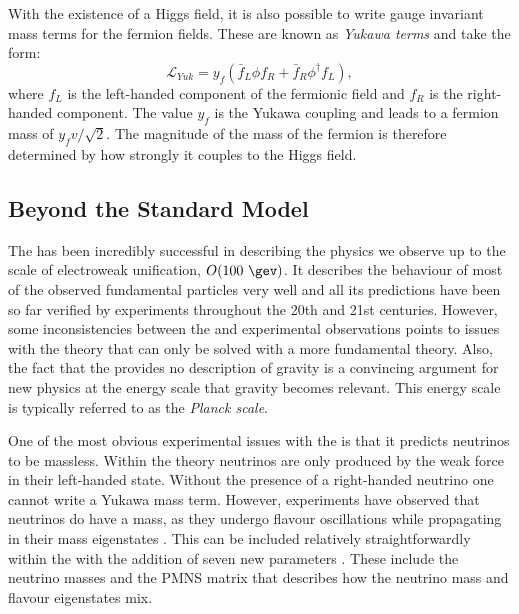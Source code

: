 With the existence of a Higgs field, it is also possible to write
gauge invariant mass terms for the fermion fields. These are known as
\emph{Yukawa terms} and take the form:
\begin{equation}
  \mathcal{L}_{Yuk}=y_{f}\left(\bar{f}_{L}\phi f_{R}+\bar{f}_{R}\phi^{\dag}f_{L}\right),
\end{equation}
where $f_L$ is the left-handed component of the fermionic field and
$f_R$ is the right-handed component. The value $y_f$ is the Yukawa
coupling and leads to a fermion mass of $y_fv/\sqrt{2}$. The magnitude
of the mass of the fermion is therefore determined by how strongly it
couples to the Higgs field.

\subsection{Beyond the Standard Model}
\label{sec:bsm}

The \SM has been incredibly successful in describing the physics we
observe up to the scale of electroweak unification, $O(100~\gev)$. It
describes the behaviour of most of the observed fundamental
particles very well and all its predictions have been so far verified by
experiments throughout the 20th and 21st centuries. However,
some inconsistencies between the \SM and experimental observations points to issues
with the theory that can only be solved with a more fundamental \BSM
theory. Also, the fact that the \SM provides no description of
gravity is a convincing argument for new physics at the energy scale
that gravity becomes relevant. This energy scale is typically referred
to as the \emph{Planck scale}.

One of the most obvious experimental issues with the \SM is that it
predicts neutrinos to be massless. Within the theory neutrinos are
only produced by the weak force in their left-handed state. Without
the presence of a right-handed neutrino one cannot write a Yukawa mass
term. However, experiments have observed that neutrinos do 
have a mass, as they undergo flavour oscillations while propagating in
their mass eigenstates \cite{PhysRevLett.87.071301,Fukuda:1998mi}.
This can be included relatively straightforwardly within the
\SM with the addition of seven new parameters
\cite{doi:10.1143/PTP.28.870}.  These include the neutrino masses and
the \ac{PMNS} matrix that describes how the neutrino mass and flavour
eigenstates mix.


